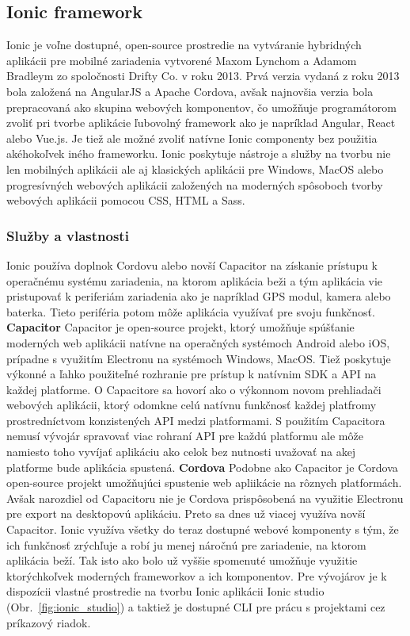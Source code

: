 \subsection{Ionic framework}
\indent Ionic je voľne dostupné, open-source prostredie na vytváranie hybridných aplikácii pre mobilné zariadenia vytvorené Maxom Lynchom a Adamom Bradleym zo spoločnosti Drifty Co. v roku 2013. Prvá verzia vydaná z roku 2013 bola založená na AngularJS a Apache Cordova, avšak najnovšia verzia bola prepracovaná ako skupina webových komponentov, čo umožňuje programátorom zvoliť pri tvorbe aplikácie ľubovolný framework ako je napríklad Angular, React alebo Vue.js. Je tiež ale možné zvoliť natívne Ionic componenty bez použitia akéhokoľvek iného frameworku. Ionic poskytuje nástroje a služby na tvorbu nie len mobilných aplikácii ale aj klasických aplikácii pre Windows, MacOS alebo progresívných webových aplikácii založených na moderných spôsoboch tvorby webových aplikácii pomocou CSS, HTML a Sass.

\subsubsection{Služby a vlastnosti}
\indent Ionic používa doplnok Cordovu alebo novší Capacitor na získanie prístupu k operačnému systému zariadenia, na ktorom aplikácia beži a tým aplikácia vie pristupovať k periferiám zariadenia ako je napríklad GPS modul, kamera alebo baterka. Tieto periféria potom môže aplikácia využívať pre svoju funkčnosť. \newline
\textbf{Capacitor}\newline
\indent Capacitor je open-source projekt, ktorý umožňuje spúšťanie moderných web aplikácii natívne na operačných systémoch Android alebo iOS, prípadne s využitím Electronu na systémoch Windows, MacOS. Tiež poskytuje výkonné a ľahko použiteľné rozhranie pre prístup k natívnim SDK a API na každej platforme. O Capacitore sa hovorí ako o výkonnom novom prehliadači webových aplikácii, ktorý odomkne celú natívnu funkčnosť každej platfromy prostredníctvom konzistených API medzi platformami. S použitím Capacitora nemusí vývojár spravovať viac rohraní API pre každú platformu ale môže namiesto toho vyvíjať aplikáciu ako celok bez nutnosti uvažovať na akej platforme bude aplikácia spustená. \newline
\textbf{Cordova}\newline
\indent Podobne ako Capacitor je Cordova open-source projekt umožňujúci spustenie web apliikácie na rôznych platformách. Avšak narozdiel od Capacitoru nie je Cordova prispôsobená na využitie Electronu pre export na desktopovú aplikáciu. Preto sa dnes už viacej využíva novší Capacitor.
\newline
\newline
\indent Ionic využíva všetky do teraz dostupné webové komponenty s tým, že ich funkčnosť zrýchľuje a robí ju menej náročnú pre zariadenie, na ktorom aplikácia beží. Tak isto ako bolo už vyššie spomenuté umožňuje využitie ktorýchkoľvek moderných frameworkov a ich komponentov. Pre vývojárov je k dispozícii vlastné prostredie na tvorbu Ionic aplikácii Ionic studio (Obr.~\ref{fig:ionic_studio}) a taktiež je dostupné CLI pre prácu s projektami cez príkazový riadok. 

